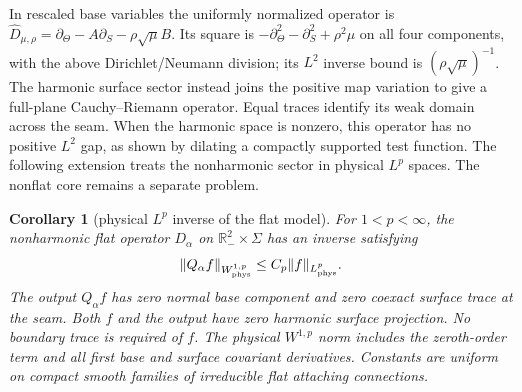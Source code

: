 \documentclass[11pt]{amsart}
\newtheorem{corollary}[theorem]{Corollary}
\theoremstyle{definition}
\theoremstyle{remark}
\theoremstyle{plain}
\newcommand{\RR}{\mathbb{R}}
\begin{document}
In rescaled base variables the uniformly normalized operator is
$\widehat D_{\mu,\rho}=\partial_\Theta-A\partial_S-\rho\sqrt\mu B$.
Its square is $-\partial_\Theta^2-\partial_S^2+\rho^2\mu$ on all four components,
with the above Dirichlet/Neumann division; its $L^2$ inverse bound is
$(\rho\sqrt\mu)^{-1}$. The harmonic surface sector instead joins the
positive map variation to give a full-plane Cauchy--Riemann operator.
Equal traces identify its weak domain across the seam. When the harmonic
space is nonzero, this operator has no positive $L^2$ gap, as shown by
dilating a compactly supported test function. The following extension
treats the nonharmonic sector in physical
$L^p$ spaces. The nonflat core remains a separate problem.

\begin{corollary}[physical $L^p$ inverse of the flat model]
\label{cor:flat-seam-lp}
For $1<p<\infty$, the nonharmonic flat operator $D_\alpha$ on
$\RR^2_-\times\Sigma$ has an inverse satisfying
\begin{equation}\label{eq:flat-physical-lp}
 \|Q_\alpha f\|_{W^{1,p}_{\rm phys}}
 \leq C_p\|f\|_{L^p_{\rm phys}}.
\end{equation}
The output $Q_\alpha f$ has zero normal base component and zero
coexact surface trace at the seam. Both $f$ and the output have zero
harmonic surface projection. No boundary trace is required of $f$.
The physical $W^{1,p}$ norm includes the zeroth-order term and all
first base and surface covariant derivatives. Constants are uniform
on compact smooth families of irreducible flat attaching connections.
\end{corollary}
\end{document}
